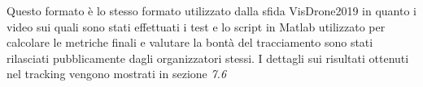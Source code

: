 Questo formato è lo stesso formato utilizzato dalla sfida VisDrone2019\cite{dronechallenge} in quanto i video sui quali sono stati effettuati i test e lo script in Matlab utilizzato per calcolare le metriche finali e valutare la bontà del tracciamento sono stati rilasciati pubblicamente dagli organizzatori stessi. I dettagli sui risultati ottenuti nel tracking vengono mostrati in sezione \textit{7.6}

